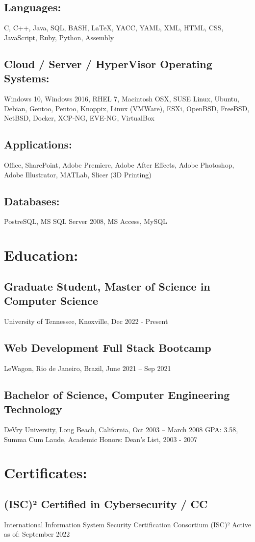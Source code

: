 \documentclass[letter,10pt]{article}
\begin{document}
\subsection*{Languages:}
\label{sec:orgf8f30f3}
C, C++, Java, SQL, BASH, \LaTeX{}, YACC, YAML, XML, HTML, CSS, JavaScript, Ruby, Python, Assembly
\subsection*{Cloud / Server / HyperVisor Operating Systems:}
\label{sec:orgdb47a46}
Windows 10, Windows 2016, RHEL 7, Macintosh OSX, SUSE Linux, Ubuntu, Debian, Gentoo, Pentoo, Knoppix, Linux  (VMWare), ESXi, OpenBSD, FreeBSD, NetBSD, Docker, XCP-NG, EVE-NG, VirtualBox
\subsection*{Applications:}
\label{sec:org6261c84}
Office, SharePoint, Adobe Premiere, Adobe After Effects, Adobe Photoshop, Adobe Illustrator, MATLab, Slicer (3D Printing)
\subsection*{Databases:}
\label{sec:org6e777ad}
PostreSQL, MS SQL Server 2008, MS Access, MySQL
\section*{Education:}
\label{sec:orga1ab2b2}
\subsection*{Graduate Student, Master of Science in Computer Science}
\label{sec:orgac97d40}
University of Tennessee, Knoxville, Dec 2022 - Present
\subsection*{Web Development Full Stack Bootcamp}
\label{sec:org3167bf6}
LeWagon, Rio de Janeiro, Brazil, June 2021 – Sep 2021
\subsection*{Bachelor of Science, Computer Engineering Technology}
\label{sec:orgc77e10a}
DeVry University, Long Beach, California, Oct 2003 – March 2008
GPA: 3.58, Summa Cum Laude, Academic Honors: Dean’s List, 2003 - 2007

\section*{Certificates:}
\label{sec:org3d0a490}
\subsection*{(ISC)² Certified in Cybersecurity / CC}
\label{sec:org99ffe51}
International Information System Security Certification Consortium (ISC)²
Active as of: September 2022
\end{document}
